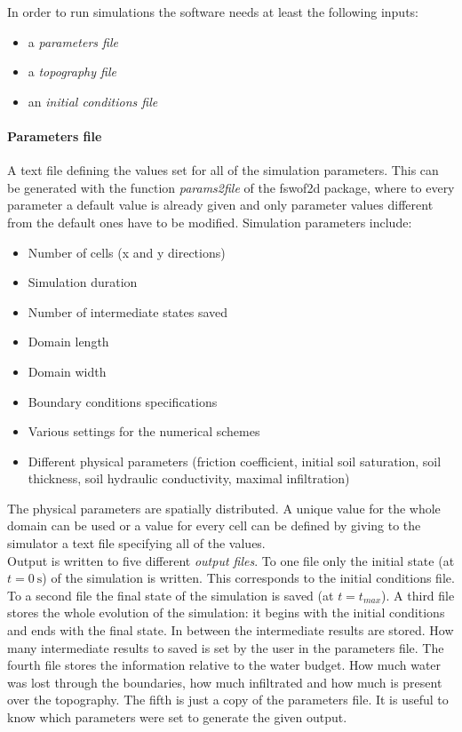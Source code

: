 In order to run simulations the software needs at least the following inputs:

\begin{itemize}
\itemsep0em
  \item a \emph{parameters file}
  \item a \emph{topography file}
  \item an \emph{initial conditions file}
\end{itemize}

\paragraph{Parameters file} A text file defining the values set for all of the simulation parameters. This can be generated with the function \textit{params2file} of the fswof2d package, where to every parameter a default value is already given and only parameter values different from the default ones have to be modified. Simulation parameters include:

\begin{itemize}
\itemsep0em
  \item Number of cells (x and y directions)
  \item Simulation duration
  \item Number of intermediate states saved
  \item Domain length
  \item Domain width
  \item Boundary conditions specifications
  \item Various settings for the numerical schemes
  \item Different physical parameters (friction coefficient, initial soil saturation, soil thickness, soil hydraulic conductivity, maximal infiltration)
\end{itemize}

The physical parameters are spatially distributed. A unique value for the whole domain can be used or a value for every cell can be defined by giving to the simulator a text file specifying all of the values.\\

Output is written to five different \emph{output files}.
To one file only the initial state (at $t = \SI{0}{\s}$) of the simulation is written.
This corresponds to the initial conditions file.
To a second file the final state of the simulation is saved (at $t = t_{max}$).
A third file stores the whole evolution of the simulation: it begins with the initial conditions and ends with the final state.
In between the intermediate results are stored.
How many intermediate results to saved is set by the user in the parameters file.
The fourth file stores the information relative to the water budget.
How much water was lost through the boundaries, how much infiltrated and how much is present over the topography.
The fifth is just a copy of the parameters file.
It is useful to know which parameters were set to generate the given output.

